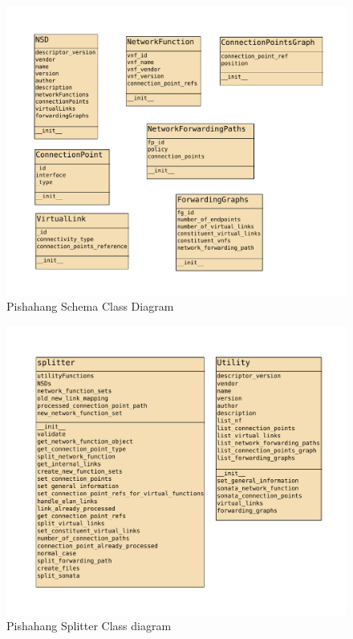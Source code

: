 \begin{figure}
	\centering
	\includegraphics[width=1\linewidth]{../figures/pishahang-schema}
	\caption{Pishahang Schema Class Diagram}
	\label{fig:pishahangschemaclassdiagram}
\end{figure}

\begin{figure}
	\centering
	\includegraphics[width=1\linewidth]{../figures/Pishahang-Splitter}
	\caption{Pishahang Splitter Class diagram}
	\label{fig:pishahangsplitterclassdiagram}
\end{figure}

